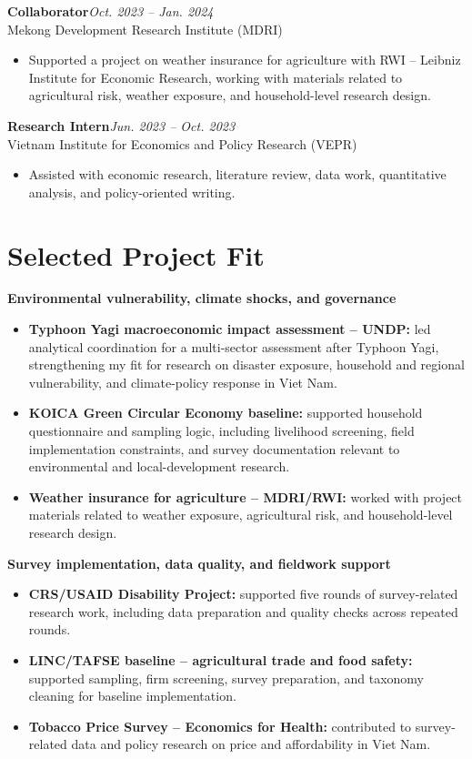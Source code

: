 \documentclass[10pt]{article}
\begin{document}
\textbf{Collaborator}\hfill\emph{Oct. 2023 -- Jan. 2024}\\
Mekong Development Research Institute (MDRI)
\begin{itemize}
\item Supported a project on weather insurance for agriculture with RWI -- Leibniz Institute for Economic Research, working with materials related to agricultural risk, weather exposure, and household-level research design.
\end{itemize}

\textbf{Research Intern}\hfill\emph{Jun. 2023 -- Oct. 2023}\\
Vietnam Institute for Economics and Policy Research (VEPR)
\begin{itemize}
\item Assisted with economic research, literature review, data work, quantitative analysis, and policy-oriented writing.
\end{itemize}

\section{Selected Project Fit}
\textbf{Environmental vulnerability, climate shocks, and governance}
\begin{itemize}
\item \textbf{Typhoon Yagi macroeconomic impact assessment -- UNDP:} led analytical coordination for a multi-sector assessment after Typhoon Yagi, strengthening my fit for research on disaster exposure, household and regional vulnerability, and climate-policy response in Viet Nam.
\item \textbf{KOICA Green Circular Economy baseline:} supported household questionnaire and sampling logic, including livelihood screening, field implementation constraints, and survey documentation relevant to environmental and local-development research.
\item \textbf{Weather insurance for agriculture -- MDRI/RWI:} worked with project materials related to weather exposure, agricultural risk, and household-level research design.
\end{itemize}

\textbf{Survey implementation, data quality, and fieldwork support}
\begin{itemize}
\item \textbf{CRS/USAID Disability Project:} supported five rounds of survey-related research work, including data preparation and quality checks across repeated rounds.
\item \textbf{LINC/TAFSE baseline -- agricultural trade and food safety:} supported sampling, firm screening, survey preparation, and taxonomy cleaning for baseline implementation.
\item \textbf{Tobacco Price Survey -- Economics for Health:} contributed to survey-related data and policy research on price and affordability in Viet Nam.
\end{itemize}
\end{document}
